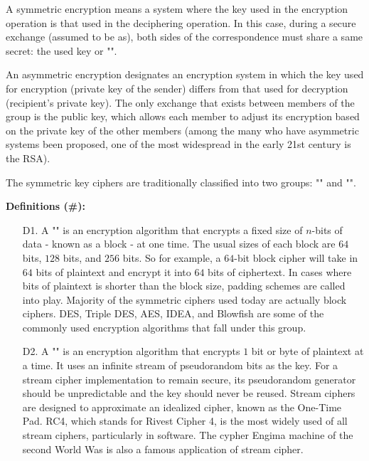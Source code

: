 		A symmetric encryption means a system where the key used in the encryption operation is that used in the deciphering operation. In this case, during a secure exchange (assumed to be as), both sides of the correspondence must share a same secret: the used key or "".
		
		An asymmetric encryption designates an encryption system in which the key used for encryption (private key of the sender) differs from that used for decryption (recipient's private key). The only exchange that exists between members of the group is the public key, which allows each member to adjust its encryption based on the private key of the other members (among the many who have asymmetric systems been proposed, one of the most widespread in the early 21st century is the RSA).
		
		The symmetric key ciphers are traditionally classified into two groups:  "" and "".
		
		\textbf{Definitions (\#\mydef):}
		\begin{enumerate}
			\item[D1.] A "" is an encryption algorithm that encrypts a fixed size of $n$-bits of data - known as a block - at one time. The usual sizes of each block are $64$ bits, $128$ bits, and $256$ bits. So for example, a $64$-bit block cipher will take in $64$ bits of plaintext and encrypt it into $64$ bits of ciphertext. In cases where bits of plaintext is shorter than the block size, padding schemes are called into play. Majority of the symmetric ciphers used today are actually block ciphers. DES, Triple DES, AES, IDEA, and Blowfish are some of the commonly used encryption algorithms that fall under this group.  
	
				\item[D2.] A "" is an encryption algorithm that encrypts $1$ bit or byte of plaintext at a time. It uses an infinite stream of pseudorandom bits as the key. For a stream cipher implementation to remain secure, its pseudorandom generator should be unpredictable and the key should never be reused. Stream ciphers are designed to approximate an idealized cipher, known as the One-Time Pad. RC4, which stands for Rivest Cipher 4, is the most widely used of all stream ciphers, particularly in software. The cypher Engima machine of the second World Was is also a famous application of stream cipher.
		\end{enumerate}
		
